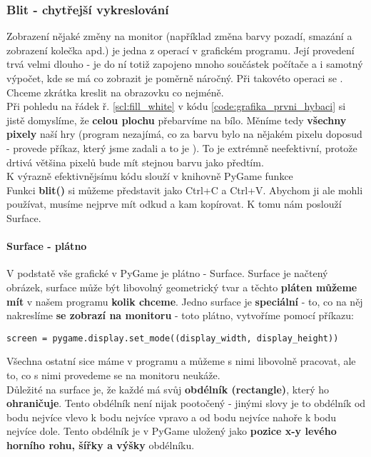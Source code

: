 \subsubsection{Blit - chytřejší vykreslování}
Zobrazení nějaké změny na monitor (například změna barvy pozadí, smazání a zobrazení kolečka apd.) je jedna z  operací v grafickém programu. Její provedení trvá velmi dlouho - je do ní totiž zapojeno mnoho součástek počítače a i samotný výpočet, kde se má co zobrazit je poměrně náročný. Při takovéto  operaci se . Chceme zkrátka kreslit na obrazovku co nejméně.\\
Při pohledu na řádek ř. \ref{scl:fill_white} v kódu \ref{code:grafika_prvni_hybaci} si jistě domyslíme, že \textbf{celou plochu} přebarvíme na bílo. Měníme tedy \textbf{všechny pixely} naší hry (program nezajímá, co za barvu bylo na nějakém pixelu doposud - provede příkaz, který jsme zadali a to je ). To je extrémně neefektivní, protože drtivá většina pixelů bude mít stejnou barvu jako předtím.\\
\vspace{.5cm}
K výrazně efektivnějsímu kódu slouží v knihovně PyGame funkce \\
Funkci \textbf{blit()} si můžeme představit jako Ctrl+C a Ctrl+V. Abychom ji ale mohli používat, musíme nejprve mít odkud a kam kopírovat. K tomu nám poslouží Surface.

\paragraph{Surface - plátno}
V podstatě vše grafické v PyGame je plátno - Surface. Surface je načtený obrázek, surface může být libovolný geometrický tvar a těchto \textbf{pláten můžeme mít} v našem programu \textbf{kolik chceme}. Jedno surface je \textbf{speciální} - to, co na něj nakreslíme \textbf{se zobrazí na monitoru} - toto plátno, vytvoříme pomocí příkazu:\\
\begin{code}
\begin{verbatim}
screen = pygame.display.set_mode((display_width, display_height))
\end{verbatim}
\end{code}
Všechna ostatní sice máme v programu a můžeme s nimi libovolně pracovat, ale to, co s nimi provedeme se na monitoru neukáže.\\

Důležité na surface je, že každé má svůj \textbf{obdélník (rectangle)}, který ho \textbf{ohraničuje}. Tento obdélník není nijak pootočený - jinými slovy je to obdélník od bodu nejvíce vlevo k bodu nejvíce vpravo a od bodu nejvíce nahoře k bodu nejvíce dole. Tento obdélník je v PyGame uložený jako \textbf{pozice x-y levého horního rohu, šířky a výšky} obdélníku.

